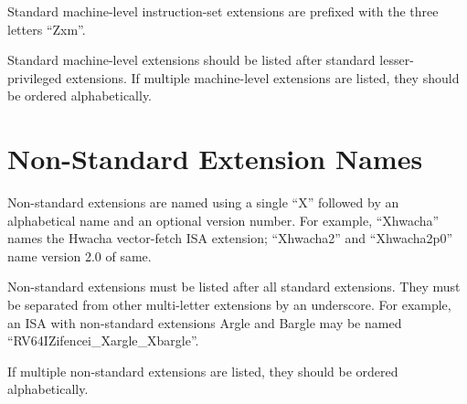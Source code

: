 Standard machine-level instruction-set extensions are prefixed with the three
letters ``Zxm''.

Standard machine-level extensions should be listed after standard
lesser-privileged extensions.  If multiple machine-level extensions are listed,
they should be ordered alphabetically.

\section{Non-Standard Extension Names}

Non-standard extensions are named using a single ``X'' followed by an
alphabetical name and an optional version number.
For example, ``Xhwacha'' names the Hwacha vector-fetch ISA extension;
``Xhwacha2'' and ``Xhwacha2p0'' name version 2.0 of same.

Non-standard extensions must be listed after all standard extensions.
They must be separated from other multi-letter extensions
by an underscore.  For example, an ISA with non-standard extensions
Argle and Bargle may be named ``RV64IZifencei\_Xargle\_Xbargle''.

If multiple non-standard extensions are listed, they should be ordered
alphabetically.

